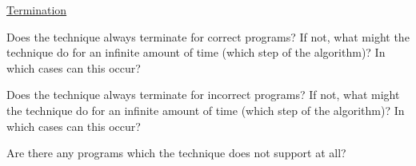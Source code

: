 \documentclass[a4paper]{article}
\begin{document}
\begin{minipage}[t]{0.16\linewidth}
\begin{betterlist}
\begin{betterlist}
\begin{betterlist}
			\end{betterlist}
			\item \underline{Termination}
			\begin{betterlist}
				\item Does the technique always terminate for correct programs? If not, what might the technique do for an infinite amount of time (which step of the algorithm)? In which cases can this occur?

				\item Does the technique always terminate for incorrect programs? If not, what might the technique do for an infinite amount of time (which step of the algorithm)? In which cases can this occur?

			\end{betterlist}
			\item Are there any programs which the technique does not support at all?


\end{betterlist}
\end{betterlist}
\end{minipage}
\end{document}
